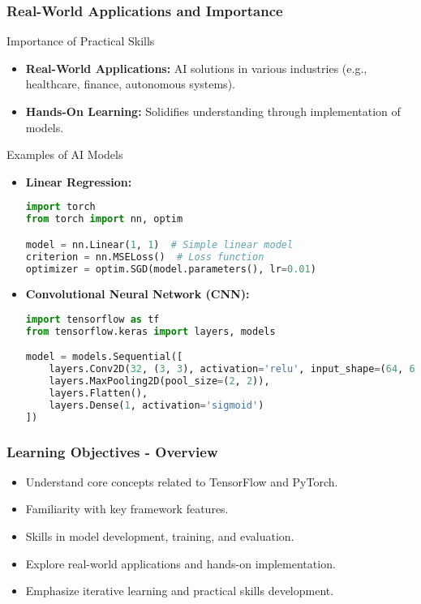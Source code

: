 \documentclass[aspectratio=169]{beamer}
\begin{document}
\begin{frame}[fragile]
    \frametitle{Real-World Applications and Importance}
    \begin{block}{Importance of Practical Skills}
        \begin{itemize}
            \item \textbf{Real-World Applications:} AI solutions in various industries (e.g., healthcare, finance, autonomous systems).
            \item \textbf{Hands-On Learning:} Solidifies understanding through implementation of models.
        \end{itemize}
    \end{block}
    \begin{block}{Examples of AI Models}
        \begin{itemize}
            \item \textbf{Linear Regression:}
                \begin{lstlisting}[language=Python]
import torch
from torch import nn, optim

model = nn.Linear(1, 1)  # Simple linear model
criterion = nn.MSELoss()  # Loss function
optimizer = optim.SGD(model.parameters(), lr=0.01)
                \end{lstlisting}

            \item \textbf{Convolutional Neural Network (CNN):}
                \begin{lstlisting}[language=Python]
import tensorflow as tf
from tensorflow.keras import layers, models

model = models.Sequential([
    layers.Conv2D(32, (3, 3), activation='relu', input_shape=(64, 64, 3)),
    layers.MaxPooling2D(pool_size=(2, 2)),
    layers.Flatten(),
    layers.Dense(1, activation='sigmoid')
])
                \end{lstlisting}
        \end{itemize}
    \end{block}
\end{frame}

\begin{frame}[fragile]
    \frametitle{Learning Objectives - Overview}
    \begin{itemize}
        \item Understand core concepts related to TensorFlow and PyTorch.
        \item Familiarity with key framework features.
        \item Skills in model development, training, and evaluation.
        \item Explore real-world applications and hands-on implementation.
        \item Emphasize iterative learning and practical skills development.
    \end{itemize}
\end{frame}
\end{document}
